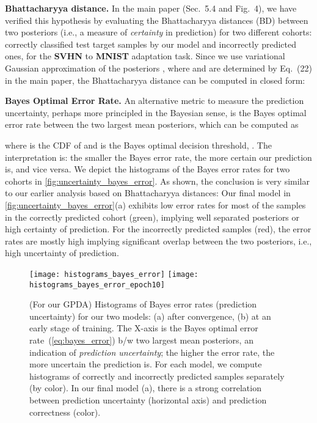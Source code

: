\documentclass[10pt,letterpaper]{article}
\begin{document}
\noindent\textbf{Bhattacharyya distance.} In the main paper (Sec.~5.4 and Fig.~4), we have verified this hypothesis by evaluating the Bhattacharyya distances (BD) between two posteriors (i.e., a measure of {\em certainty} in prediction) for two different cohorts: correctly classified test target samples by our model and incorrectly predicted ones, for the \textbf{SVHN} to \textbf{MNIST} adaptation task.  
Since we use variational Gaussian approximation of the posteriors , 
where  and  are determined by Eq.~(22) in the main paper, the Bhattacharyya distance can be computed in closed form:



\noindent\textbf{Bayes Optimal Error Rate.} An alternative metric to measure the prediction uncertainty, perhaps more principled in the Bayesian sense, is the Bayes optimal error rate between the two largest mean posteriors, which can be computed as

where  is the CDF of  and  is the Bayes optimal decision threshold, . 
The interpretation is: the smaller the Bayes error rate, the more certain our prediction is, and vice versa. We depict the histograms of the Bayes error rates for two cohorts in \autoref{fig:uncertainty_bayes_error}. 
As shown, the conclusion is very similar to our earlier analysis based on Bhattacharyya distances: Our final model in \autoref{fig:uncertainty_bayes_error}(a) exhibits low error rates for most of the samples in the correctly predicted cohort (green), implying well separated posteriors or high certainty of prediction. For the incorrectly predicted samples (red), the error rates are mostly high implying significant overlap between the two posteriors, i.e., high uncertainty of prediction. \\

\begin{figure}\begin{center}
\texttt{[image: histograms\_bayes\_error]} \texttt{[image: histograms\_bayes\_error\_epoch10]}
\end{center}
\vspace{-1.7em}
\caption{(For our GPDA) Histograms of Bayes error rates (prediction uncertainty) for our two models: (a) after convergence, (b) at an early stage of training. The X-axis is the Bayes optimal error rate~(\ref{eq:bayes_error}) b/w two largest mean posteriors, an indication of {\em prediction uncertainty}; the higher the error rate, the more uncertain the prediction is. For each model, we compute histograms of correctly and incorrectly predicted samples separately (by color). In our final model (a), there is a strong correlation between prediction uncertainty (horizontal axis) and prediction correctness (color).}
\label{fig:uncertainty_bayes_error}
\end{figure}
\end{document}
